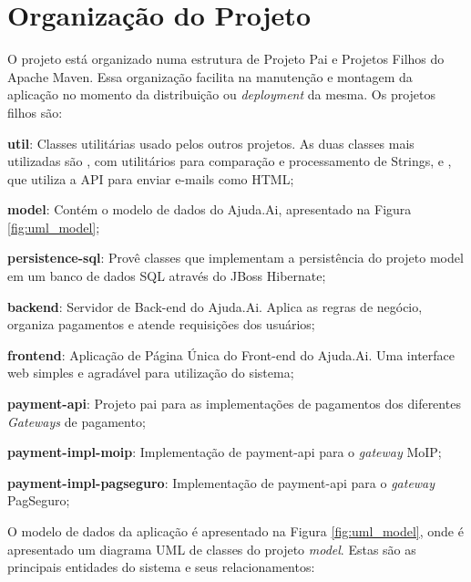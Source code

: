 \section{Organização do Projeto} \label{sec:ajudaai:organizacao}
O projeto está organizado numa estrutura de Projeto Pai e Projetos Filhos do Apache Maven. Essa organização facilita na manutenção e montagem da aplicação no momento da distribuição ou \emph{deployment} da mesma. Os projetos filhos são:

\begin{lista}
  \item \textbf{util}: Classes utilitárias usado pelos outros projetos. As duas classes mais utilizadas são , com utilitários para comparação e processamento de Strings, e , que utiliza a API  para enviar e-mails como HTML;
  \item \textbf{model}: Contém o modelo de dados do Ajuda.Ai, apresentado na Figura \ref{fig:uml_model};
  \item \textbf{persistence-sql}: Provê classes que implementam a persistência do projeto model em um banco de dados SQL através do JBoss Hibernate;
  \item \textbf{backend}: Servidor de Back-end do Ajuda.Ai. Aplica as regras de negócio, organiza pagamentos e atende requisições dos usuários;
  \item \textbf{frontend}: Aplicação de Página Única do Front-end do Ajuda.Ai. Uma interface web simples e agradável para utilização do sistema;
  \item \textbf{payment-api}: Projeto pai para as implementações de pagamentos dos diferentes \emph{Gateways} de pagamento;
  \item \textbf{payment-impl-moip}: Implementação de payment-api para o \emph{gateway} MoIP;
  \item \textbf{payment-impl-pagseguro}: Implementação de payment-api para o \emph{gateway} PagSeguro;
\end{lista}

O modelo de dados da aplicação é apresentado na Figura \ref{fig:uml_model}, onde é apresentado um diagrama UML de classes do projeto \emph{model}. Estas são as principais entidades do sistema e seus relacionamentos:

